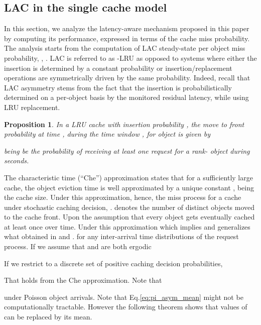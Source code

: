 \documentclass[conference]{IEEEtran}
\newtheorem{proposition}{Proposition}
\begin{document}
\subsection{LAC in the single cache model} \label{sec:single_cache}
In this section, we analyze the latency-aware mechanism proposed in this paper
by computing its performance, expressed in terms of the cache miss probability.
The analysis starts from the computation of LAC steady-state per object 
miss probability, , . LAC is referred to as -LRU 
as opposed to systems where either the insertion is determined by a constant 
probability  or insertion/replacement operations are symmetrically driven 
by the same probability. Indeed, recall that LAC asymmetry stems from the fact 
that the insertion is probabilistically determined on a per-object basis by the 
monitored residual latency, while using LRU replacement.

\begin{proposition} \label{prop:MTF_arrival_process}
In a LRU cache with insertion probability , 
the move to front probability at time , during the time window , 
for object  is given by

being   be the probability of receiving at least one request for a 
rank- object during  seconds.
\end{proposition}

The characteristic time (``Che'') approximation 
\cite{Che:2006:HWC:2312147.2313846} states that for a 
sufficiently large cache, the object eviction time is well 
approximated by a unique constant , being  the 
cache size.  Under this approximation, hence, the miss 
process for a cache under stochastic caching decision, 
.
 denotes the number of distinct objects moved to 
the cache front. Upon the assumption that every object gets 
eventually cached at least once over time.
Under this approximation  
which implies 
and generalizes what obtained in 
\cite{DBLP:journals/corr/MartinaGL13} and 
\cite{Bianchi:2013:CBS:2500098.2500106}.
for any inter-arrival time distributions of the request 
process. If we assume that  and   
are both ergodic 


If we restrict to a discrete set of positive caching decision 
probabilities,





That holds from the Che approximation. Note that 
 
under Poisson object arrivals. Note that 
Eq.\eqref{eq:pi_asym_mean} might not be computationally 
tractable. However the following theorem shows that values of 
 can be replaced by its mean.
\end{document}
